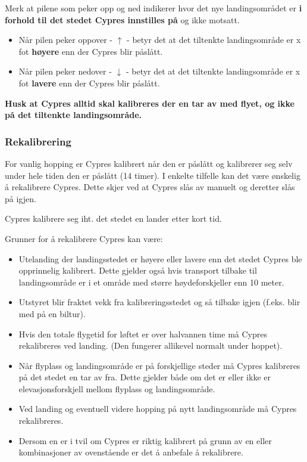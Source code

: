 Merk at pilene som peker opp og ned indikerer hvor det nye landingsområdet er \textbf{i forhold til det stedet Cypres innstilles på} og ikke motsatt.
\begin{itemize}
\item Når pilen peker oppover - $\uparrow$ - betyr det at det tiltenkte landingsområde er x fot \textbf{høyere} enn der Cypres blir påslått.
\item Når pilen peker nedover - $\downarrow$ - betyr det at det tiltenkte landingsområde er x fot \textbf{lavere} enn der Cypres blir påslått.
\end{itemize}

\textbf{Husk at Cypres alltid skal kalibreres der en tar av med flyet, og ikke på det tiltenkte landingsområde.}

\subsubsection{Rekalibrering}
For vanlig hopping er Cypres kalibrert når den er påslått og kalibrerer seg selv under hele tiden den er påslått (14 timer). I enkelte tilfelle kan det være ønskelig å rekalibrere Cypres. Dette skjer ved at Cypres slås av manuelt og deretter slås på igjen.

Cypres kalibrere seg iht. det stedet en lander etter kort tid.

Grunner for å rekalibrere Cypres kan være:
\begin{itemize}
\item Utelanding der landingsstedet er høyere eller lavere enn det stedet Cypres ble opprinnelig kalibrert. Dette gjelder også hvis transport tilbake til landingsområde er i et område med større høydeforskjeller enn 10 meter.
\item Utstyret blir fraktet vekk fra kalibreringsstedet og så tilbake igjen (f.eks. blir med på en biltur).
\item Hvis den totale flygetid for løftet er over halvannen time må Cypres rekalibreres ved landing. (Den fungerer allikevel normalt under hoppet).
\item Når flyplass og landingsområde er på forskjellige steder må Cypres kalibreres på det stedet en tar av fra. Dette gjelder både om det er eller ikke er elevasjonsforskjell mellom flyplass og landingsområde.
\item Ved landing og eventuell videre hopping på nytt landingsområde må Cypres rekalibreres.
\item Dersom en er i tvil om Cypres er riktig kalibrert på grunn av en eller kombinasjoner av ovenstående er det å anbefale å rekalibrere.
\end{itemize}

